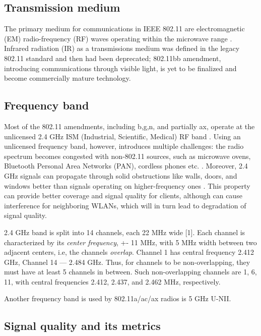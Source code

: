 \subsection{Transmission medium}

The primary medium for communications in IEEE 802.11 are electromagnetic (EM) radio-frequency (RF) waves operating within the microwave range \cite{tanenbaumComputerNetworks2020}. Infrared radiation (IR) as a transmissions medium was defined in the legacy 802.11 standard and then had been deprecated; 802.11bb amendment, introducing communications through visible light, is yet to be finalized and become commercially mature technology.

\subsection{Frequency band}

Most of the 802.11 amendments, including b,g,n, and partially ax, operate at the unlicensed 2.4 GHz ISM (Industrial, Scientific, Medical) RF band \cite{tanenbaumComputerNetworks2020, colemanCWNACertifiedWireless2021}. Using an unlicensed frequency band, however, introduces multiple challenges: the radio spectrum becomes congested with non-802.11 sources, such as microwave ovens, Bluetooth Personal Area Networks (PAN), cordless phones etc. \cite{tanenbaumComputerNetworks2020, colemanCWNACertifiedWireless2021}. Moreover, 2.4 GHz signals can propagate through solid obstructions like walls, doors, and windows better than signals operating on higher-frequency ones \cite{colemanCWNACertifiedWireless2021}. This property can provide better coverage and signal quality for clients, although can cause interference for neighboring WLANs, which will in turn lead to degradation of signal quality.

2.4 GHz band is split into 14 channels, each 22 MHz wide [1]. Each channel is characterized by its \textit{center frequency}, +- 11 MHz, with 5 MHz width between two adjacent centers, i.e, the channels \textit{overlap}. Channel 1 has central frequency 2.412 GHz, Channel 14 — 2.484 GHz. Thus, for channels to be non-overlapping, they must have at least 5 channels in between. Such non-overlapping channels are 1, 6, 11, with central frequencies 2.412, 2.437, and 2.462 MHz, respectively.

Another frequency band is used by 802.11a/ac/ax radios is 5 GHz U-NII.

\subsection{Signal quality and its metrics}

